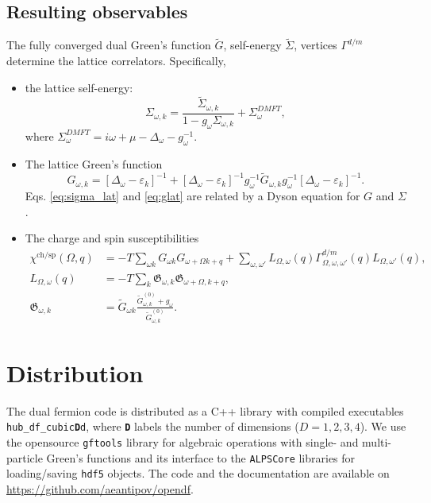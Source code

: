 \documentclass[3p,times,procedia]{elsarticle}
\begin{document}
\subsection{Resulting observables}
The fully converged dual Green's function $\tilde G$, self-energy $\tilde \Sigma$, vertices $\Gamma^{d/m}$ determine the lattice correlators. Specifically, 
\begin{itemize}
\item the lattice self-energy: 
\begin{equation}\label{eq:sigma_lat}
\Sigma_{\omega, k} = \frac{\tilde \Sigma_{\omega, k}}{1 - g_\omega \Sigma_{\omega, k}} + \Sigma^{DMFT}_{\omega},
\end{equation}
where $\Sigma^{DMFT}_{\omega} = i\omega + \mu - \Delta_{\omega} - g_\omega^{-1}$. 
\item The lattice Green's function
\begin{equation}\label{eq:glat}
G_{\omega,k} = \left[\Delta_{\omega} - \varepsilon_{k}\right]^{-1} + \left[\Delta_{\omega} - \varepsilon_{k}\right]^{-1} g_{\omega}^{-1} \tilde G_{\omega, k} g_{\omega}^{-1} \left[\Delta_{\omega} - \varepsilon_{k}\right]^{-1}.
\end{equation}
Eqs. \ref{eq:sigma_lat} and \ref{eq:glat} are related by a Dyson equation for $G$ and $\Sigma$. 
\item The charge and spin susceptibilities
\begin{align}
\chi^{\mathrm{ch/sp}} (\Omega, q) & = -T \sum_{\omega k} G_{\omega k} G_{\omega+\Omega k+q} + \sum_{\omega,\omega'} L_{\Omega, \omega}(q) \Gamma^{d/m}_{\Omega,\omega,\omega'}(q) L_{\Omega, \omega'}(q), \\
L_{\Omega, \omega}(q) & = -T \sum_k \mathfrak{G}_{\omega,k} \mathfrak{G}_{\omega + \Omega,k + q}, \\
\mathfrak{G}_{\omega,k} & = \tilde G_{\omega k} \frac{\tilde G^{(0)}_{\omega, k} + g_\omega}{\tilde G^{(0)}_{\omega, k}}.
\end{align}
\end{itemize}

\section{Distribution}\label{sec:imp}
The dual fermion code is distributed as a C++ library with compiled executables \texttt{hub\_df\_cubic{\bf D}d}, where \texttt{\bf D} labels the number of dimensions ($D=1,2,3,4$). We use the opensource \texttt{gftools} library \cite{gftools} for algebraic operations with single- and multi-particle Green's functions and its interface to the \texttt{ALPSCore} libraries \cite{ALPSCore} for loading/saving \texttt{hdf5} objects. The code and the documentation are available on \url{https://github.com/aeantipov/opendf}.
\end{document}
